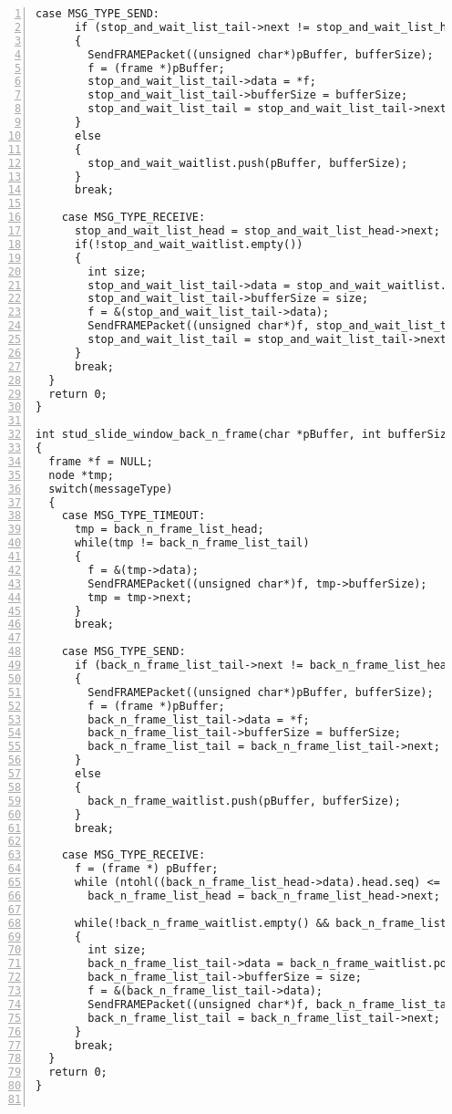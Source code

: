 \documentclass[a4paper,12pt,notitlepage]{article}
\begin{document}
\begin{lstlisting}[frame=shadowbox,numbers=left]
    case MSG_TYPE_SEND:
      if (stop_and_wait_list_tail->next != stop_and_wait_list_head)
      {
        SendFRAMEPacket((unsigned char*)pBuffer, bufferSize);
        f = (frame *)pBuffer;
        stop_and_wait_list_tail->data = *f;
        stop_and_wait_list_tail->bufferSize = bufferSize;
        stop_and_wait_list_tail = stop_and_wait_list_tail->next;
      }
      else
      {
        stop_and_wait_waitlist.push(pBuffer, bufferSize);
      }
      break;

    case MSG_TYPE_RECEIVE:
      stop_and_wait_list_head = stop_and_wait_list_head->next;
      if(!stop_and_wait_waitlist.empty())
      {
        int size;
        stop_and_wait_list_tail->data = stop_and_wait_waitlist.pop(size);  
        stop_and_wait_list_tail->bufferSize = size;
        f = &(stop_and_wait_list_tail->data);
        SendFRAMEPacket((unsigned char*)f, stop_and_wait_list_tail->bufferSize);
        stop_and_wait_list_tail = stop_and_wait_list_tail->next;
      }
      break;
  }
  return 0;
}

int stud_slide_window_back_n_frame(char *pBuffer, int bufferSize, UINT8 messageType)
{
  frame *f = NULL;
  node *tmp;
  switch(messageType) 
  {
    case MSG_TYPE_TIMEOUT:
      tmp = back_n_frame_list_head;
      while(tmp != back_n_frame_list_tail)
      {
        f = &(tmp->data);
        SendFRAMEPacket((unsigned char*)f, tmp->bufferSize);
        tmp = tmp->next;
      }
      break;

    case MSG_TYPE_SEND:
      if (back_n_frame_list_tail->next != back_n_frame_list_head)
      {
        SendFRAMEPacket((unsigned char*)pBuffer, bufferSize);
        f = (frame *)pBuffer;
        back_n_frame_list_tail->data = *f;
        back_n_frame_list_tail->bufferSize = bufferSize;
        back_n_frame_list_tail = back_n_frame_list_tail->next;
      }
      else
      {
        back_n_frame_waitlist.push(pBuffer, bufferSize);
      }
      break;

    case MSG_TYPE_RECEIVE:
      f = (frame *) pBuffer;
      while (ntohl((back_n_frame_list_head->data).head.seq) <= ntohl(f->head.ack) && back_n_frame_list_head != back_n_frame_list_tail)
        back_n_frame_list_head = back_n_frame_list_head->next;

      while(!back_n_frame_waitlist.empty() && back_n_frame_list_tail->next != back_n_frame_list_head )
      {
        int size;
        back_n_frame_list_tail->data = back_n_frame_waitlist.pop(size);  
        back_n_frame_list_tail->bufferSize = size;
        f = &(back_n_frame_list_tail->data);
        SendFRAMEPacket((unsigned char*)f, back_n_frame_list_tail->bufferSize);
        back_n_frame_list_tail = back_n_frame_list_tail->next;
      }
      break;
  }
  return 0;
}


\end{lstlisting}
\end{document}
